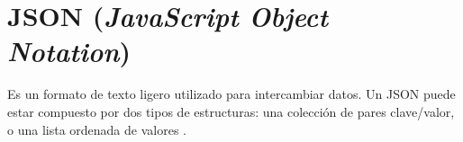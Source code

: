 \section{JSON (\textit{JavaScript Object Notation})}

Es un formato de texto ligero utilizado para intercambiar datos. Un JSON puede estar compuesto por dos tipos de estructuras: una colección de pares clave/valor, o una lista ordenada de valores \cite{JSN0}. 